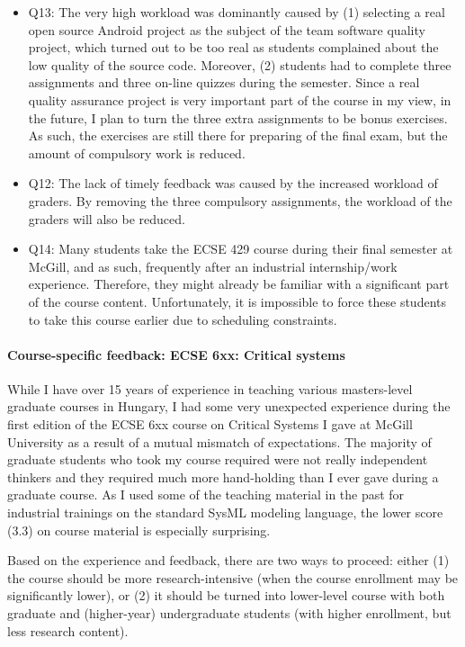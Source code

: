 \documentclass[a4paper,11pt]{article}
\begin{document}
\begin{itemize}
\item Q13: The very high workload was dominantly caused by (1) selecting a real open source Android project as the subject of the team software quality project, which turned out to be too real as students complained about the low quality of the source code. Moreover, (2) students had to complete three assignments and three on-line quizzes during the semester. Since a real quality assurance project is very important part of the course in my view, in the future, I plan to turn the three extra assignments to be bonus exercises. As such, the exercises are still there for preparing of the final exam, but the amount of compulsory work is reduced. 

\item Q12: The lack of timely feedback was caused by the increased workload of graders. By removing the three compulsory assignments, the workload of the graders will also be reduced. 

\item Q14: Many students take the ECSE 429 course during their final semester at McGill, and as such, frequently after an industrial internship/work experience. Therefore, they might already be familiar with a significant part of the course content. Unfortunately, it is impossible to force these students to take this course earlier due to scheduling constraints. 

\end{itemize}


\paragraph{Course-specific feedback: ECSE 6xx: Critical systems}
While I have over 15 years of experience in teaching various masters-level graduate courses in Hungary, I had some very unexpected experience during the first edition of the ECSE 6xx course on Critical Systems I gave at McGill University as a result of a mutual mismatch of expectations. The majority of graduate students who took my course required were not really independent thinkers and they required much more hand-holding than I ever gave during a graduate course. As I used some of the teaching material in the past for industrial trainings on the standard SysML modeling language, the lower score (3.3) on course material is especially surprising.

Based on the experience and feedback, there are two ways to proceed: either (1) the course should be more research-intensive (when the course enrollment may be significantly lower), or (2) it should be turned into lower-level course with both graduate and (higher-year) undergraduate students (with higher enrollment, but less research content). 
\end{document}
